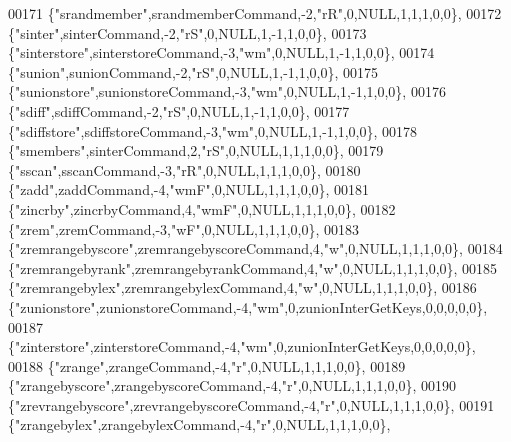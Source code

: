 \begin{DoxyCode}
00171     \{\textcolor{stringliteral}{"srandmember"},srandmemberCommand,-2,\textcolor{stringliteral}{"rR"},0,NULL,1,1,1,0,0\},
00172     \{\textcolor{stringliteral}{"sinter"},sinterCommand,-2,\textcolor{stringliteral}{"rS"},0,NULL,1,-1,1,0,0\},
00173     \{\textcolor{stringliteral}{"sinterstore"},sinterstoreCommand,-3,\textcolor{stringliteral}{"wm"},0,NULL,1,-1,1,0,0\},
00174     \{\textcolor{stringliteral}{"sunion"},sunionCommand,-2,\textcolor{stringliteral}{"rS"},0,NULL,1,-1,1,0,0\},
00175     \{\textcolor{stringliteral}{"sunionstore"},sunionstoreCommand,-3,\textcolor{stringliteral}{"wm"},0,NULL,1,-1,1,0,0\},
00176     \{\textcolor{stringliteral}{"sdiff"},sdiffCommand,-2,\textcolor{stringliteral}{"rS"},0,NULL,1,-1,1,0,0\},
00177     \{\textcolor{stringliteral}{"sdiffstore"},sdiffstoreCommand,-3,\textcolor{stringliteral}{"wm"},0,NULL,1,-1,1,0,0\},
00178     \{\textcolor{stringliteral}{"smembers"},sinterCommand,2,\textcolor{stringliteral}{"rS"},0,NULL,1,1,1,0,0\},
00179     \{\textcolor{stringliteral}{"sscan"},sscanCommand,-3,\textcolor{stringliteral}{"rR"},0,NULL,1,1,1,0,0\},
00180     \{\textcolor{stringliteral}{"zadd"},zaddCommand,-4,\textcolor{stringliteral}{"wmF"},0,NULL,1,1,1,0,0\},
00181     \{\textcolor{stringliteral}{"zincrby"},zincrbyCommand,4,\textcolor{stringliteral}{"wmF"},0,NULL,1,1,1,0,0\},
00182     \{\textcolor{stringliteral}{"zrem"},zremCommand,-3,\textcolor{stringliteral}{"wF"},0,NULL,1,1,1,0,0\},
00183     \{\textcolor{stringliteral}{"zremrangebyscore"},zremrangebyscoreCommand,4,\textcolor{stringliteral}{"w"},0,NULL,1,1,1,0,0\},
00184     \{\textcolor{stringliteral}{"zremrangebyrank"},zremrangebyrankCommand,4,\textcolor{stringliteral}{"w"},0,NULL,1,1,1,0,0\},
00185     \{\textcolor{stringliteral}{"zremrangebylex"},zremrangebylexCommand,4,\textcolor{stringliteral}{"w"},0,NULL,1,1,1,0,0\},
00186     \{\textcolor{stringliteral}{"zunionstore"},zunionstoreCommand,-4,\textcolor{stringliteral}{"wm"},0,zunionInterGetKeys,0,0,0,0,0\},
00187     \{\textcolor{stringliteral}{"zinterstore"},zinterstoreCommand,-4,\textcolor{stringliteral}{"wm"},0,zunionInterGetKeys,0,0,0,0,0\},
00188     \{\textcolor{stringliteral}{"zrange"},zrangeCommand,-4,\textcolor{stringliteral}{"r"},0,NULL,1,1,1,0,0\},
00189     \{\textcolor{stringliteral}{"zrangebyscore"},zrangebyscoreCommand,-4,\textcolor{stringliteral}{"r"},0,NULL,1,1,1,0,0\},
00190     \{\textcolor{stringliteral}{"zrevrangebyscore"},zrevrangebyscoreCommand,-4,\textcolor{stringliteral}{"r"},0,NULL,1,1,1,0,0\},
00191     \{\textcolor{stringliteral}{"zrangebylex"},zrangebylexCommand,-4,\textcolor{stringliteral}{"r"},0,NULL,1,1,1,0,0\},

\end{DoxyCode}
